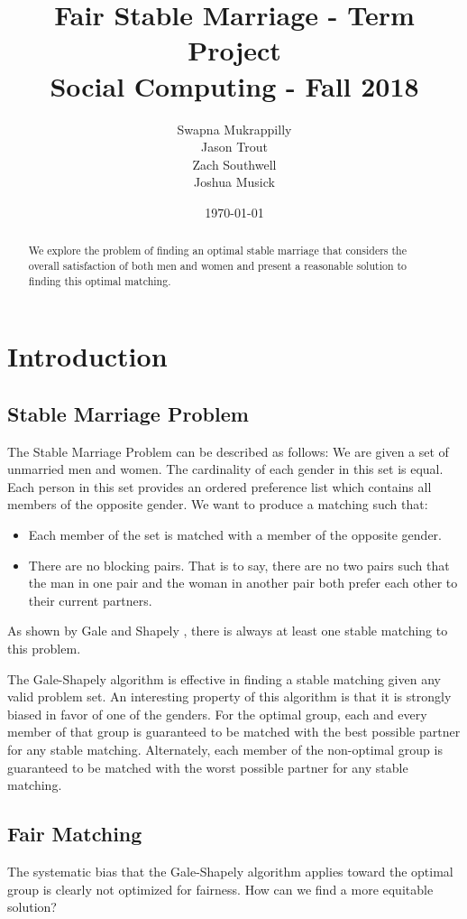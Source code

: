 \documentclass[a4paper]{article}
\title{Fair Stable Marriage - Term Project\\Social Computing - Fall 2018}
\author{Swapna Mukrappilly\\Jason Trout\\Zach Southwell\\Joshua Musick}
\date{\today}
\begin{document}
\maketitle

\begin{abstract}
We explore the problem of finding an optimal stable marriage that considers the overall satisfaction of both men and women and present a reasonable solution to finding this optimal matching.

\end{abstract}

\section{Introduction}
\label{sec:introduction}

\subsection{Stable Marriage Problem}
The Stable Marriage Problem can be described as follows: We are given a set of unmarried men and women. The cardinality of each gender in this set is equal. Each person in this set provides an ordered preference list which contains all members of the opposite gender. We want to produce a matching such that:
\begin{itemize}
    \item Each member of the set is matched with a member of the opposite gender.
    \item There are no blocking pairs. That is to say, there are no two pairs such that the man in one pair and the woman in another pair both prefer each other to their current partners.
\end{itemize}
As shown by Gale and Shapely \cite{shapely}, there is always at least one stable matching to this problem.

The Gale-Shapely algorithm is effective in finding a stable matching given any valid problem set. An interesting property of this algorithm is that it is strongly biased in favor of one of the genders. For the optimal group, each and every member of that group is guaranteed to be matched with the best possible partner for any stable matching. Alternately, each member of the non-optimal group is guaranteed to be matched with the worst possible partner for any stable matching.

\subsection{Fair Matching}
The systematic bias that the Gale-Shapely algorithm applies toward the optimal group is clearly not optimized for fairness. How can we find a more equitable solution?
\end{document}
